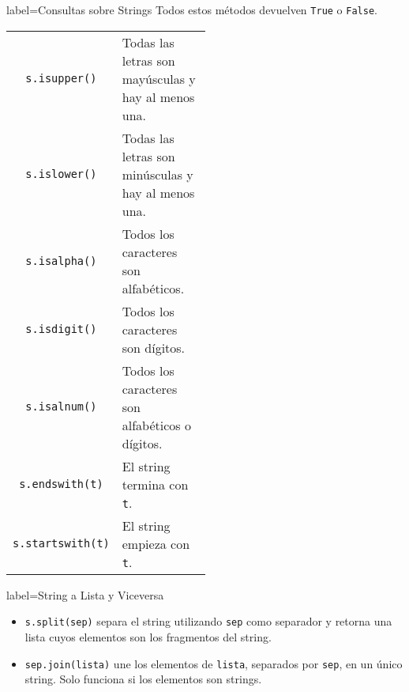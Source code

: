 \begin{contentbox}{label=Consultas sobre Strings}
    Todos estos métodos devuelven \texttt{True} o \texttt{False}.
    
    \begin{tabular}{C|p{0.5\linewidth}}
        \lstinline!s.isupper()! & Todas las letras son mayúsculas y hay al menos una. \\
        \lstinline!s.islower()! & Todas las letras son minúsculas y hay al menos una. \\
        \lstinline!s.isalpha()! & Todos los caracteres son alfabéticos. \\
        \lstinline!s.isdigit()! & Todos los caracteres son dígitos. \\
        \lstinline!s.isalnum()! & Todos los caracteres son alfabéticos o dígitos. \\
        \lstinline!s.endswith(t)! & El string termina con \texttt{t}. \\
        \lstinline!s.startswith(t)! & El string empieza con \texttt{t}.
    \end{tabular}
\end{contentbox}

\begin{contentbox}{label=String a Lista y Viceversa}
    \begin{itemize}
        \item \lstinline!s.split(sep)! separa el string utilizando \texttt{sep} como separador y retorna una lista cuyos elementos son los fragmentos del string.
        \item \lstinline!sep.join(lista)! une los elementos de \texttt{lista}, separados por \texttt{sep}, en un único string. Solo funciona si los elementos son strings.
    \end{itemize}
\end{contentbox}

